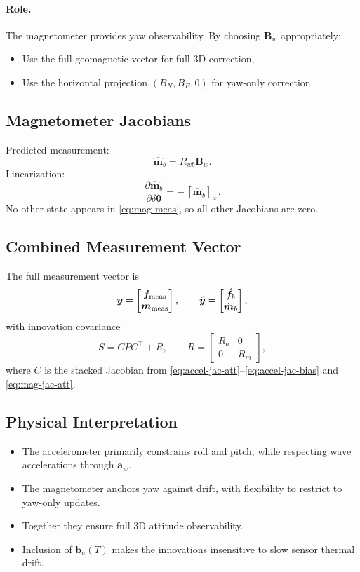 \documentclass[11pt]{article}
\begin{document}
\paragraph{Role.}
The magnetometer provides yaw observability. By choosing $\bm B_w$ appropriately:
\begin{itemize}
\item Use the full geomagnetic vector for full 3D correction,
\item Use the horizontal projection $(B_N,B_E,0)$ for yaw-only correction.
\end{itemize}

\subsection{Magnetometer Jacobians}
Predicted measurement:
\[
\hat{\bm m}_b = R_{wb}\bm B_w.
\]
Linearization:
\begin{equation}
\frac{\partial \hat{\bm m}_b}{\partial \delta\bm\theta} = -\,[\hat{\bm m}_b]_\times.
\label{eq:mag-jac-att}
\end{equation}
No other state appears in \eqref{eq:mag-meas}, so all other Jacobians are zero.

\subsection{Combined Measurement Vector}
The full measurement vector is
\[
\bm y = \begin{bmatrix}\bm f_{\rm meas}\\ \bm m_{\rm meas}\end{bmatrix},
\qquad
\hat{\bm y} = \begin{bmatrix}\hat{\bm f}_b\\ \hat{\bm m}_b\end{bmatrix},
\]
with innovation covariance
\begin{equation}
S = C P C^\top + R,
\qquad
R = \begin{bmatrix} R_a & 0 \\ 0 & R_m \end{bmatrix},
\label{eq:meas-cov}
\end{equation}
where $C$ is the stacked Jacobian from \eqref{eq:accel-jac-att}--\eqref{eq:accel-jac-bias} and \eqref{eq:mag-jac-att}.

\subsection{Physical Interpretation}
\begin{itemize}
\item The accelerometer primarily constrains roll and pitch, while respecting wave accelerations
through $\bm a_w$.
\item The magnetometer anchors yaw against drift, with flexibility to restrict to yaw-only updates.
\item Together they ensure full 3D attitude observability.
\item Inclusion of $\bm b_a(T)$ makes the innovations insensitive to slow sensor thermal drift.
\end{itemize}
\end{document}
